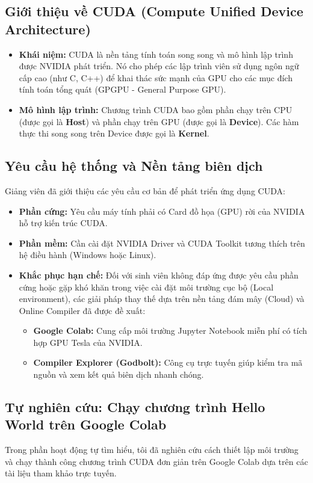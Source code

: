 \documentclass[12pt,a4paper]{article}
\begin{document}
\subsection{Giới thiệu về CUDA (Compute Unified Device Architecture)}
\begin{itemize}
    \item \textbf{Khái niệm:} CUDA là nền tảng tính toán song song và mô hình lập trình được NVIDIA phát triển. Nó cho phép các lập trình viên sử dụng ngôn ngữ cấp cao (như C, C++) để khai thác sức mạnh của GPU cho các mục đích tính toán tổng quát (GPGPU - General Purpose GPU).
    \item \textbf{Mô hình lập trình:} Chương trình CUDA bao gồm phần chạy trên CPU (được gọi là \textbf{Host}) và phần chạy trên GPU (được gọi là \textbf{Device}). Các hàm thực thi song song trên Device được gọi là \textbf{Kernel}.
\end{itemize}

\subsection{Yêu cầu hệ thống và Nền tảng biên dịch}
Giảng viên đã giới thiệu các yêu cầu cơ bản để phát triển ứng dụng CUDA:

\begin{itemize}
    \item \textbf{Phần cứng:} Yêu cầu máy tính phải có Card đồ họa (GPU) rời của NVIDIA hỗ trợ kiến trúc CUDA.
    \item \textbf{Phần mềm:} Cần cài đặt NVIDIA Driver và CUDA Toolkit tương thích trên hệ điều hành (Windows hoặc Linux).
    \item \textbf{Khắc phục hạn chế:} Đối với sinh viên không đáp ứng được yêu cầu phần cứng hoặc gặp khó khăn trong việc cài đặt môi trường cục bộ (Local environment), các giải pháp thay thế dựa trên nền tảng đám mây (Cloud) và Online Compiler đã được đề xuất:
    \begin{itemize}
        \item \textbf{Google Colab:} Cung cấp môi trường Jupyter Notebook miễn phí có tích hợp GPU Tesla của NVIDIA.
        \item \textbf{Compiler Explorer (Godbolt):} Công cụ trực tuyến giúp kiểm tra mã nguồn và xem kết quả biên dịch nhanh chóng.
    \end{itemize}
\end{itemize}

\subsection{Tự nghiên cứu: Chạy chương trình Hello World trên Google Colab}
Trong phần hoạt động tự tìm hiểu, tôi đã nghiên cứu cách thiết lập môi trường và chạy thành công chương trình CUDA đơn giản trên Google Colab dựa trên các tài liệu tham khảo trực tuyến.
\end{document}
